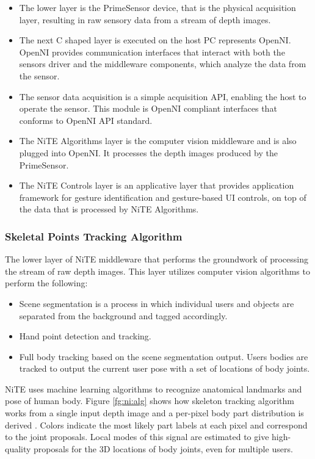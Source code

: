 \begin{itemize}
	\item The lower layer is the PrimeSensor device, that is the physical acquisition layer, resulting in raw sensory data from a stream of depth images. 
	\item The next C shaped layer is executed on the host PC represents OpenNI. OpenNI provides communication interfaces that interact with both the sensors driver and the middleware components, which analyze the data from the sensor. 
	\item The sensor data acquisition is a simple acquisition API, enabling the host to operate the sensor. This module is OpenNI compliant interfaces that conforms to OpenNI API standard. 
	\item The NiTE Algorithms layer is the computer vision middleware and is also plugged into OpenNI. It processes the depth images produced by the PrimeSensor. 
	\item The NiTE Controls layer is an applicative layer that provides application framework for gesture identification and gesture-based UI controls, on top of the data that is processed by NiTE Algorithms. 
\end{itemize}

\subsubsection{Skeletal Points Tracking Algorithm} The lower layer of NiTE middleware that performs the groundwork of processing the stream of raw depth images. This layer utilizes computer vision algorithms to perform the following: 
\begin{itemize}
	\item Scene segmentation is a process in which individual users and objects are separated from the background and tagged accordingly. 
	\item Hand point detection and tracking. 
	\item Full body tracking based on the scene segmentation output. Users bodies are tracked to output the current user pose with a set of locations of body joints. 
\end{itemize}

NiTE uses machine learning algorithms to recognize anatomical landmarks and pose of human body. Figure \ref{fg:ni:alg} shows how skeleton tracking algorithm works from a single input depth image and a per-pixel body part distribution is derived \cite{13}. Colors indicate the most likely part labels at each pixel and correspond to the joint proposals. Local modes of this signal are estimated to give high-quality proposals for the 3D locations of body joints, even for multiple users.


